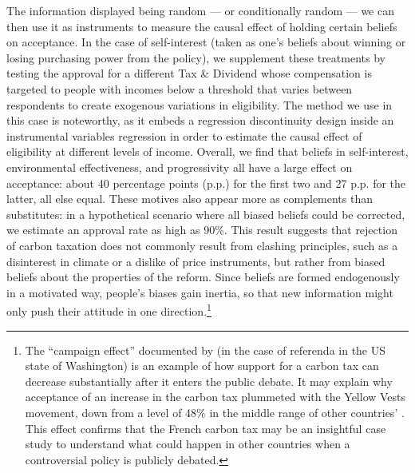 \documentclass[11pt]{article}
\begin{document}
The information displayed being random --- or conditionally random --- we can then use it as instruments to measure the causal effect of holding certain beliefs on acceptance. In the case of self-interest (taken as one's beliefs about winning or losing purchasing power from the policy), we supplement these treatments by testing the approval for a different Tax \& Dividend whose compensation is targeted to people with incomes below a threshold that varies between respondents to create exogenous variations in eligibility. The method we use in this case is noteworthy, as it embeds a regression discontinuity design inside an instrumental variables regression in order to estimate the causal effect of eligibility at different levels of income. Overall, we find that beliefs in self-interest, environmental effectiveness, and progressivity all have a large effect on acceptance: about 40 percentage points (p.p.) for the first two and 27 p.p. for the latter, all else equal. These motives also appear more as complements than substitutes: in a hypothetical scenario where all biased beliefs could be corrected, we estimate an approval rate as high as 90\%. This result suggests that rejection of carbon taxation does not commonly result from clashing principles, such as a disinterest in climate or a dislike of price instruments, but rather from biased beliefs about the properties of the reform. Since beliefs are formed endogenously in a motivated way, people's biases gain inertia, so that new information might only push their attitude in one direction.\footnote{The ``campaign effect'' documented by \citet{anderson_can_2019} (in the case of referenda in the US state of Washington) is an example of how support for a carbon tax can decrease substantially after it enters the public debate. It may explain why acceptance of an increase in the carbon tax plummeted with the Yellow Vests movement, down from a level of 48\% \citep{ademe_representations_2018} in the middle range of other countries' \citep{brechin_public_2010}. This effect confirms that the French carbon tax may be an insightful case study to understand what could happen in other countries when a controversial policy is publicly debated.}
\end{document}

